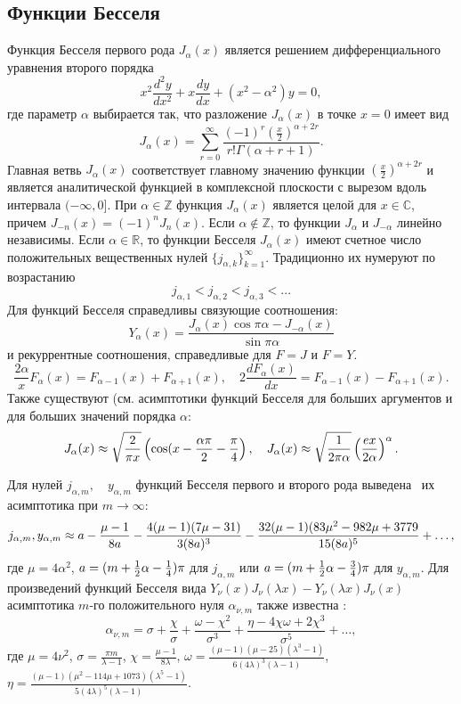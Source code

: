 \subsection{Функции Бесселя}\label{subsec:ch1/sec1/sub2}
Функция Бесселя первого рода $J_\alpha(x)$ является решением дифференциального уравнения второго порядка
$$x^2\frac{d^2y}{dx^2} + x\frac{dy}{dx} + (x^2 - \alpha^2)y=0,$$
где параметр $\alpha$ выбирается так, что разложение $J_\alpha(x)$ в точке $x=0$ имеет вид
$$J_\alpha(x) = \sum_{r=0}^\infty \frac{(-1)^r (\frac{x}{2})^{\alpha + 2r}}{r! \Gamma(\alpha+r+1)}.$$
Главная ветвь $J_\alpha(x)$ соответствует главному значению функции $(\frac{x}{2})^{\alpha + 2r}$ и является аналитической функцией в комплексной плоскости с вырезом вдоль интервала $(-\infty, 0]$. 
При $\alpha \in \mathbb{Z}$ функция $J_\alpha(x)$ является целой для $x \in \mathbb{C}$, причем $J_{-n}(x) = (-1)^nJ_n(x)$. Если $\alpha \notin \mathbb{Z}$, то функции $J_\alpha$ и $J_{-\alpha}$ линейно независимы.
Если $\alpha \in \mathbb{R}$, то функции Бесселя $J_\alpha(x)$ имеют счетное число положительных вещественных нулей $\{ j_{\alpha, k} \}_{k=1}^\infty$. Традиционно их нумеруют по возрастанию 
$$j_{\alpha, 1} < j_{\alpha, 2} < j_{\alpha, 3} < ...$$
Для функций Бесселя справедливы связующие соотношения:
$$Y_\alpha(x) = \frac{J_\alpha(x) \cos \pi \alpha - J_{-\alpha}(x)}{\sin \pi \alpha}$$ и рекуррентные соотношения, справедливые для $F=J$ и $F=Y$.
$$ \frac{2\alpha}{x}F_\alpha(x) = F_{\alpha-1}(x)+F_{\alpha+1}(x), \quad 
2\frac{d F_\alpha(x)}{d x} = F_{\alpha-1}(x)-F_{\alpha+1}(x).$$ 
Также существуют (см. \cite[\S~10.19]{wref5} асимптотики функций Бесселя для больших аргументов и для больших значений порядка $\alpha$:
$$J_\alpha(x) \approx \sqrt{2 \over \pi x}\left( \cos(x - \frac{\alpha \pi}{2} - \frac{\pi}{4} \right), \quad J_\alpha(x) \approx \sqrt{1 \over 2 \pi \alpha}\left(e x  \over 2 \alpha\right)^\alpha.$$

Для нулей $j_{\alpha, m}, \quad y_{\alpha, m}$ функций Бесселя первого и второго рода выведена~\cite{wref3} их асимптотика при $m \to \infty$:
$$j_{\alpha, m}, y_{\alpha, m} \approx a - {\mu - 1 \over 8 a} - {4(\mu - 1)(7\mu - 31) \over 3(8a)^3} - {32(\mu - 1)(83\mu^2 - 982\mu + 3779 \over 15(8a)^5}+\dots,$$
где $\mu = 4 \alpha^2$, $a=(m+{1\over2}\alpha - {1\over4})\pi$ для $j_{\alpha, m}$ или $a=(m+{1\over2}\alpha - {3\over4})\pi$ для $y_{\alpha, m}$.
Для произведений функций Бесселя вида $Y_\nu(x) J_\nu(\lambda x) - Y_\nu(\lambda x) J_\nu(x)$ асимптотика $m$-го положительного нуля $\alpha_{\nu, m}$ также известна  \cite[\S\ 9, с.~358]{wref2}:
 $$\alpha_{\nu, m} = \sigma + \frac{\chi}{\sigma} + \frac{\omega-\chi^2}{\sigma^3} + \frac{\eta-4\chi \omega +2\chi^3}{\sigma^5} + \dots,$$
 где $\mu=4\nu^2$,
$\sigma=\frac{\pi m}{\lambda - 1}$,
 $\chi = \frac{\mu - 1}{8 \lambda}$,
 $\omega = \frac{(\mu-1)(\mu-25)(\lambda^3 - 1)}{6(4\lambda)^3(\lambda-1)}$,
 $\eta = \frac{(\mu-1)(\mu^2-114\mu+1073)(\lambda^5-1)}{5(4\lambda)^5(\lambda-1)}$.

